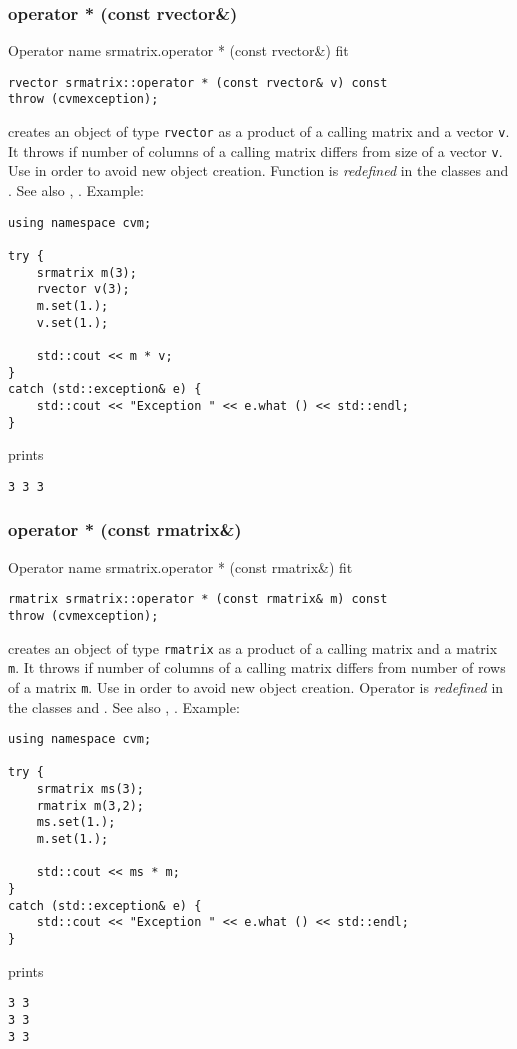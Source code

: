 \subsubsection{operator * (const rvector\&)}
Operator%
\pdfdest name {srmatrix.operator * (const rvector&)} fit
\begin{verbatim}
rvector srmatrix::operator * (const rvector& v) const
throw (cvmexception);
\end{verbatim}
creates an object of type \verb"rvector"
as a product of a calling matrix and a vector \verb"v".
It throws  
if  number of columns of a calling matrix
differs from  size of a vector \verb"v".
Use 
in order to avoid new object creation.
Function is \emph{redefined} in the classes
and .
See also
, .
Example:
\begin{Verbatim}
using namespace cvm;

try {
    srmatrix m(3);
    rvector v(3);
    m.set(1.);
    v.set(1.);

    std::cout << m * v;
}
catch (std::exception& e) {
    std::cout << "Exception " << e.what () << std::endl;
}
\end{Verbatim}
prints
\begin{Verbatim}
3 3 3
\end{Verbatim}
\newpage



\subsubsection{operator * (const rmatrix\&)}
Operator%
\pdfdest name {srmatrix.operator * (const rmatrix&)} fit
\begin{verbatim}
rmatrix srmatrix::operator * (const rmatrix& m) const
throw (cvmexception);
\end{verbatim}
creates an object of type \verb"rmatrix"
as a product of a calling matrix and a matrix \verb"m".
It throws  
if  number of columns of a calling matrix
differs from  number of rows of a matrix \verb"m".
Use  in order to avoid
 new object creation.
Operator is \emph{redefined} in the classes
and .
See also
, .
Example:
\begin{Verbatim}
using namespace cvm;

try {
    srmatrix ms(3);
    rmatrix m(3,2);
    ms.set(1.);
    m.set(1.);

    std::cout << ms * m;
}
catch (std::exception& e) {
    std::cout << "Exception " << e.what () << std::endl;
}
\end{Verbatim}
prints
\begin{Verbatim}
3 3
3 3
3 3
\end{Verbatim}
\newpage




